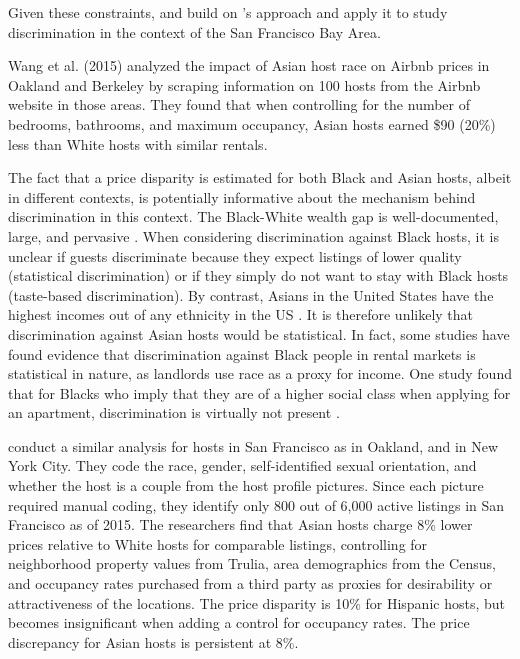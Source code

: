 Given these constraints, \cite{wang} and \cite{kakar} build on \cite{edelman}'s approach and apply it to study discrimination in the context of the San Francisco Bay Area. 

Wang et al. (2015) analyzed the impact of Asian host race on Airbnb prices in Oakland and Berkeley by scraping information on 100 hosts from the Airbnb website in those areas. They found that when controlling for the number of bedrooms, bathrooms, and maximum occupancy, Asian hosts earned \$90 (20\%) less than White hosts with similar rentals. 

The fact that a price disparity is estimated for both Black and Asian hosts, albeit in different contexts, is potentially informative about the mechanism behind discrimination in this context. The Black-White wealth gap is well-documented, large, and pervasive \citep{cfed, heywood, bayard, mason, chiteji, altonji, gittleman}. When considering discrimination against Black hosts, it is unclear if guests discriminate because they expect listings of lower quality (statistical discrimination) or if they simply do not want to stay with Black hosts (taste-based discrimination). By contrast, Asians in the United States have the highest incomes out of any ethnicity in the US \citep{income}. It is therefore unlikely that discrimination against Asian hosts would be statistical. In fact, some studies have found evidence that discrimination against Black people in rental markets is statistical in nature, as landlords use race as a proxy for income. One study found that for Blacks who imply that they are of a higher social class when applying for an apartment, discrimination is virtually not present \citep{hanson}.

\cite{kakar} conduct a similar analysis for hosts in San Francisco as \cite{wang} in Oakland, and \cite{edelman} in New York City. They code the race, gender, self-identified sexual orientation, and whether the host is a couple from the host profile pictures. Since each picture required manual coding, they identify only 800 out of 6,000 active listings in San Francisco as of 2015. The researchers find that Asian hosts charge 8\% lower prices relative to White hosts for comparable listings, controlling for neighborhood property values from Trulia, area demographics from the Census, and occupancy rates purchased from a third party as proxies for desirability or attractiveness of the locations. The price disparity is 10\% for Hispanic hosts, but becomes insignificant when adding a control for occupancy rates. The price discrepancy for Asian hosts is persistent at 8\%. 

